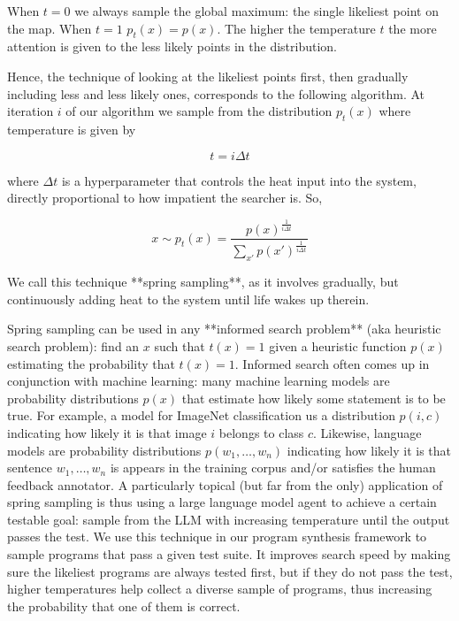 When $t=0$ we always sample the global maximum: the single likeliest point on the map. 
When $t=1$ $p_t(x)=p(x)$.
The higher the temperature $t$ the more attention is given to the less likely points in the distribution.

Hence, the technique of looking at the likeliest points first, then gradually including less and less likely ones, corresponds to the following algorithm. At iteration $i$ of our algorithm we sample from the distribution $p_t(x)$ where temperature is given by

\begin{equation}
t = i \Delta t
\end{equation}

where $\Delta t$ is a hyperparameter that controls the heat input into the system, directly proportional to how impatient the searcher is. So,

\begin{equation}
x \sim p_t(x) = \frac{p(x)^{\frac{1}{i \Delta t}}}{\sum_{x'} p(x')^{\frac{1}{i \Delta t}}}
\end{equation}

We call this technique **spring sampling**, as it involves gradually, but continuously adding heat to the system until life wakes up therein.

Spring sampling can be used in any **informed search problem** (aka heuristic search problem): find an $x$ such that $t(x)=1$ given a heuristic function $p(x)$ estimating the probability that $t(x)=1$. 
Informed search often comes up in conjunction with machine learning: many machine learning models are probability distributions $p(x)$ that estimate how likely some statement is to be true.
For example, a model for ImageNet classification \cite{dengImagenetLargescaleHierarchical2009} us a distribution $p(i,c)$ indicating how likely it is that image $i$ belongs to class $c$.
Likewise, language models are probability distributions $p(w_1,\dots,w_n)$ indicating how likely it is that sentence $w_1,\dots,w_n$ is appears in the training corpus and/or satisfies the human feedback annotator.
A particularly topical (but far from the only) application of spring sampling is thus using a large language model agent to achieve a certain testable goal: sample from the LLM with increasing temperature until the output passes the test.
We use this technique in our program synthesis framework to sample programs that pass a given test suite.
It improves search speed by making sure the likeliest programs are always tested first, but if they do not pass the test, higher temperatures help collect a diverse sample of programs, thus increasing the probability that one of them is correct.

